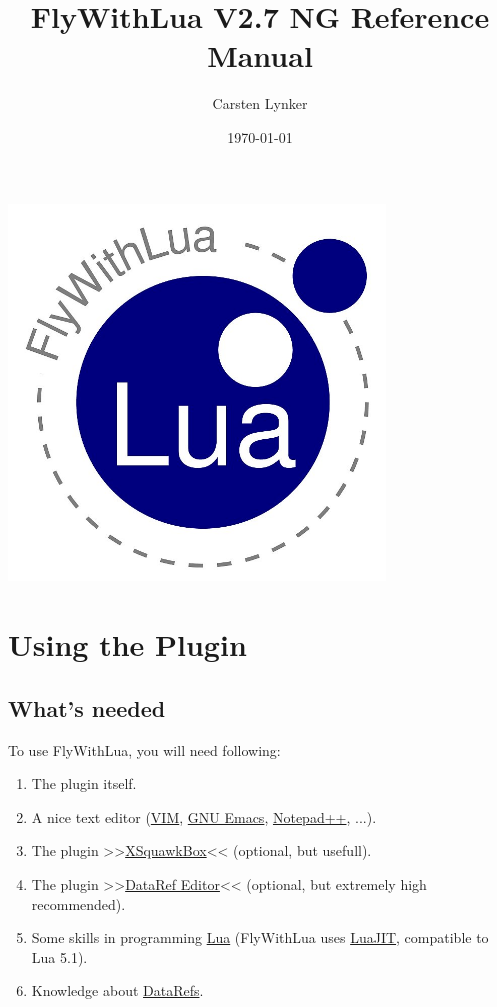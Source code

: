 \documentclass[11pt,parskip=half,a4paper]{scrartcl}
\begin{document}
\title{FlyWithLua V2.7 NG Reference Manual}
\author{Carsten Lynker}
\date{\today}

\maketitle
\vspace{2cm}

\begin{center}
\includegraphics[width=10cm]{FlyWithLua_logo.jpg}
\end{center}
\thispagestyle{empty}
\newpage
\verb||
\tableofcontents

\newpage
\section{Using the Plugin}
\subsection{What's needed}

To use FlyWithLua, you will need following:

\begin{enumerate}
\item The plugin itself.
\item A nice text editor (\href{http://www.vim.org/}{VIM}, \href{http://www.gnu.org/software/emacs/}{GNU Emacs}, \href{http://notepad-plus-plus.org/}{Notepad++}, ...).
\item The plugin >>\href{http://www.xsquawkbox.net/xsb/}{XSquawkBox}<< (optional, but usefull).
\item The plugin >>\href{http://wiki.x-plane.com/DataRefEditor}{DataRef Editor}<< (optional, but extremely high recommended).
\item Some skills in programming \href{http://www.lua.org}{Lua} (FlyWithLua uses \href{http://luajit.org/}{LuaJIT}, compatible to Lua 5.1).
\item Knowledge about \href{http://www.xsquawkbox.net/xpsdk/docs/DataRefs.html}{DataRefs}.
\end{enumerate}
\end{document}
